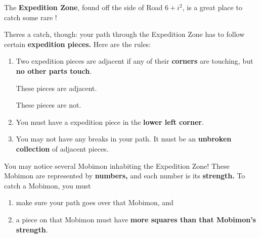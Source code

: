 

The \textbf{Expedition Zone}, found off the side of
Road \(6+i^2\), is a great place to catch some rare \mappMobimon{}!

Theres a catch, though: your path through the Expedition Zone has to follow
certain \textbf{expedition pieces.} Here are the rules:
\begin{enumerate}
\item Two expedition pieces are adjacent if any of their \textbf{corners} are
  touching, but \textbf{no other parts touch}.
  \begin{center}
    These pieces are adjacent.

  \end{center}

  \begin{center}
    These pieces are not.

  \end{center}

\item You must have a expedition piece in the \textbf{lower left corner}.
\item You may not have any breaks in your path. It must be an \textbf{unbroken
    collection} of adjacent pieces.
\end{enumerate}

You may notice several Mobimon inhabiting the Expedition Zone! These Mobimon are
represented by \textbf{numbers,} and each number is its \textbf{strength.} To
catch a Mobimon, you must

\begin{enumerate}
\item make sure your path goes over that Mobimon, and
\item a piece on that Mobimon must have \textbf{more squares than that Mobimon's
  strength}.
\end{enumerate}

